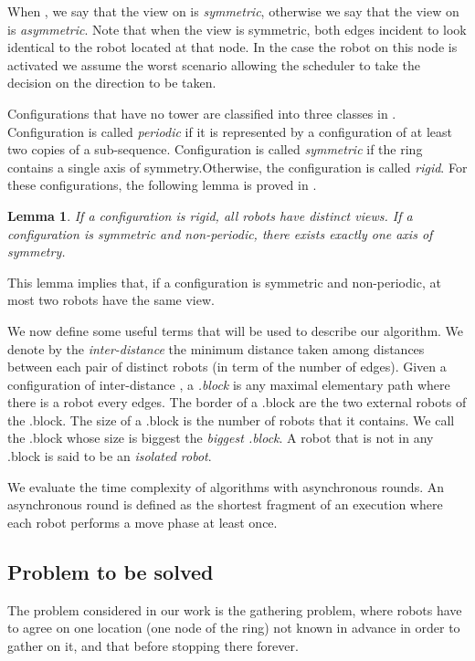\documentclass[11pt]{article}
\newtheorem{lemma}{Lemma}
\begin{document}
When , we say that the view on  is \textit{symmetric}, otherwise we say that the view on  is \textit{asymmetric}. 
Note that when the view is symmetric, both edges incident to  look identical to the robot located at that node. 
In the case the robot on this node is activated we assume the worst scenario allowing the scheduler to take the decision on the direction to be taken.  


Configurations that have no tower are classified into three classes in \cite{Klasing08-j}.
Configuration is called \textit{periodic} if it is represented by a configuration of at least two copies of a sub-sequence.
Configuration is called \textit{symmetric} if the ring contains a single axis of symmetry.Otherwise, the configuration is called \textit{rigid}. 
For these configurations, the following lemma is proved in \cite{Klasing06}.
\begin{lemma}
If a configuration is rigid, all robots have distinct views. If a configuration is symmetric and non-periodic, there exists exactly one axis of symmetry.
\end{lemma}
This lemma implies that, if a configuration is symmetric and non-periodic, at most two robots have the same view.

We now define some useful terms that will be used to describe our algorithm. 
We denote by the \textit{inter-distance}  the minimum distance taken among distances between each pair of distinct robots (in term of the number of edges). 
Given a configuration of inter-distance , a \textit{.block} is any maximal elementary path where there is a robot every  edges. 
The border of a .block are the two external robots of the .block. 
The size of a .block is the number of robots that it contains. 
We call the .block whose size is biggest the \textit{biggest .block}.
A robot that is not in any .block is said to be an \textit{isolated robot}. 

We evaluate the time complexity of algorithms with asynchronous rounds. An asynchronous round is defined as the shortest fragment of an execution where each robot performs a move phase at least once.

\subsection{Problem to be solved}\label{sec:Prb}
The problem considered in our work is the gathering problem, where  robots have to agree on one location (one node of the ring) not known in advance in order to gather on it, and that before stopping there forever.
\end{document}
